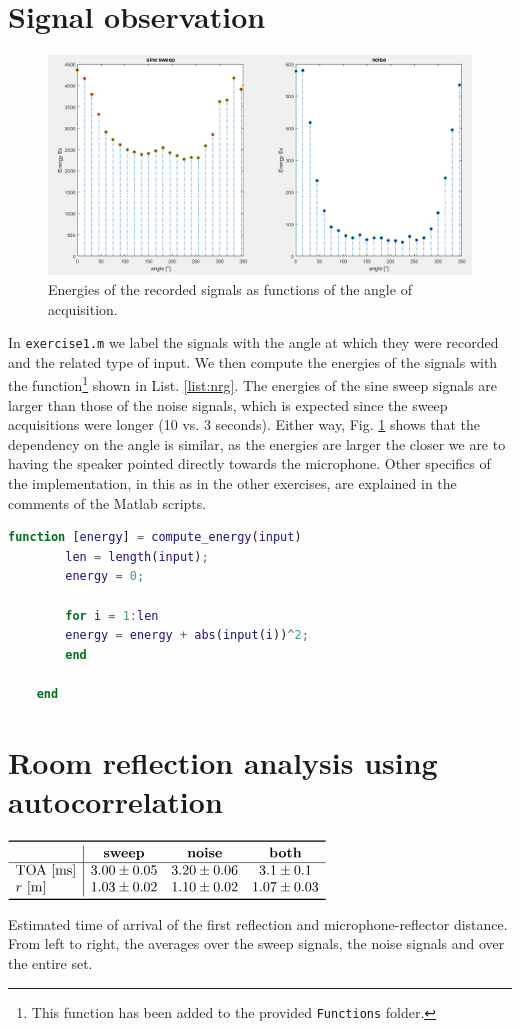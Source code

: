 \documentclass[a4paper]{article}
\begin{document}
\section{Signal observation}
\begin{figure}[h]
	\centering
	\includegraphics[width=0.75\linewidth]{sig_energy.png}
	\caption{Energies of the recorded signals as functions of the angle of acquisition.}
	\label{fig:energy}
\end{figure}

In \verb|exercise1.m| we label the signals with the angle at which they were recorded and the related type of input. We then compute the energies of the signals with the function\footnote{This function has been added to the provided \texttt{Functions} folder.} shown in List. \ref{list:nrg}. The energies of the sine sweep signals are larger than those of the noise signals, which is expected since the sweep acquisitions were longer (10 vs. 3 seconds). Either way, Fig. \ref{fig:energy} shows that the dependency on the angle is similar, as the energies are larger the closer we are to having the speaker pointed directly towards the microphone. Other specifics of the implementation, in this as in the other exercises, are explained in the comments of the Matlab scripts.

\begin{lstlisting}[language=Matlab, caption=compute\_energy.m, label=list:nrg]
	function [energy] = compute_energy(input)
		len = length(input);
		energy = 0;
		
		for i = 1:len
		energy = energy + abs(input(i))^2;
		end
	
	end
\end{lstlisting}

\section{Room reflection analysis using autocorrelation}
\begin{table}[h!]
	\centering
	$\begin{array}{l|ccc}
		\toprule
		& \text{\textbf{sweep}} & \text{\textbf{noise}} & \text{\textbf{both}}\\
		\hline
		\text{TOA [ms]} & 3.00 \pm 0.05 & 3.20 \pm 0.06 & 3.1 \pm  0.1 \\
		r\text{ [m]} & 1.03 \pm 0.02 & 1.10 \pm 0.02 & 1.07 \pm 0.03\\
		\bottomrule
	\end{array}$
	\caption{Estimated time of arrival of the first reflection and microphone-reflector distance. From left to right, the averages over the sweep signals, the noise signals and over the entire set.}
	\label{tab:refl}
\end{table}
\end{document}
